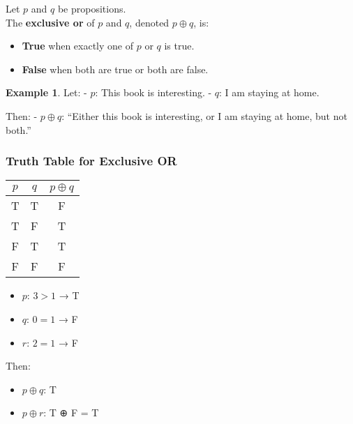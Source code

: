 \documentclass[
]{book}
\providecommand{\tightlist}{%
  \setlength{\itemsep}{0pt}\setlength{\parskip}{0pt}}
\theoremstyle{definition}
\theoremstyle{definition}
\newtheorem{example}{Example}[chapter]
\theoremstyle{definition}
\theoremstyle{definition}
\theoremstyle{remark}
\begin{document}
Let \(p\) and \(q\) be propositions.\\
The \textbf{exclusive or} of \(p\) and \(q\), denoted \(p \oplus q\), is:

\begin{itemize}
\tightlist
\item
  \textbf{True} when exactly one of \(p\) or \(q\) is true.
\item
  \textbf{False} when both are true or both are false.
\end{itemize}

\begin{example}
\protect\hypertarget{exm:unnamed-chunk-19}{}\label{exm:unnamed-chunk-19}Let:
- \(p\): This book is interesting.
- \(q\): I am staying at home.

Then:
- \(p \oplus q\): ``Either this book is interesting, or I am staying at home, but not both.''
\end{example}

\subsubsection{Truth Table for Exclusive OR}\label{truth-table-for-exclusive-or-1}

\begin{longtable}[]{@{}ccc@{}}
\toprule\noalign{}
\(p\) & \(q\) & \(p \oplus q\) \\
\midrule\noalign{}
\endhead
\bottomrule\noalign{}
\endlastfoot
T & T & F \\
T & F & T \\
F & T & T \\
F & F & F \\
\end{longtable}

\begin{itemize}
\tightlist
\item
  \(p\): \(3 > 1\) → T\\
\item
  \(q\): \(0 = 1\) → F\\
\item
  \(r\): \(2 = 1\) → F
\end{itemize}

Then:

\begin{itemize}
\tightlist
\item
  \(p \oplus q\): T\\
\item
  \(p \oplus r\): T ⊕ F = T
\end{itemize}
\end{document}

